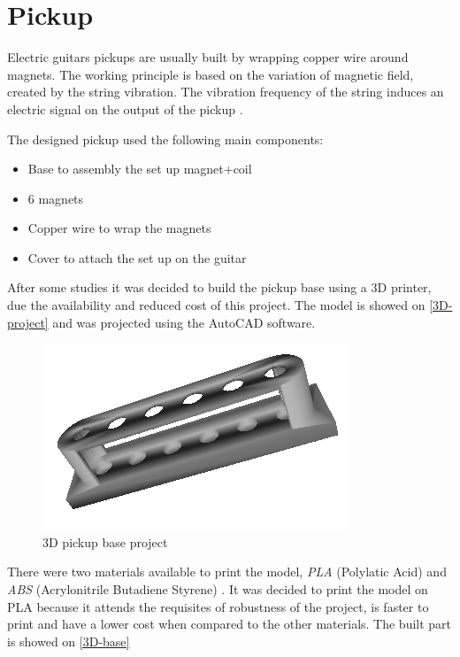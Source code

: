 \section{Pickup}
\label{pickup}

Electric guitars pickups are usually built by wrapping copper wire around magnets.
The working principle is based on the variation of magnetic field, created by the string
vibration. The vibration frequency of the string induces an electric signal on the output of the pickup \cite{pickup-work}
\cite{faraday-law}.

The designed pickup used the following main components:

{\begin{itemize}
  \item Base to assembly the set up magnet+coil
  \item 6 magnets
  \item Copper wire to wrap the magnets
  \item Cover to attach the set up on the guitar
\end{itemize}}

After some studies it was decided to build the pickup base using a 3D printer, due the
availability and reduced cost of this project. The model is showed on \autoref{3D-project}
and was projected using the AutoCAD software.

\begin{figure}[!htpb]
\centering
\caption{3D pickup base project}
\label{3D-project}
\includegraphics[scale=0.5]{images/pickup}
\end{figure}

There were two materials available to print the model, \textit{PLA} (Polylatic Acid) \cite{3d-materials}
and \textit{ABS} (Acrylonitrile Butadiene Styrene) \cite{3d-materials}. It was decided to print
the model on PLA because it attends the requisites of robustness of the project, is
faster to print and have a lower cost when compared to the other materials. The built part is showed on
\autoref{3D-base} \\

